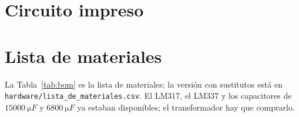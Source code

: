 \documentclass[conference]{IEEEtran}
\begin{document}
\section{Circuito impreso}


\section{Lista de materiales}
La Tabla~\ref{tab:bom} es la lista de materiales; la versión con sustitutos está en \texttt{hardware/lista\_de\_materiales.csv}. El LM317, el LM337 y los capacitores de $\SI{15000}{\micro F}$ y $\SI{6800}{\micro F}$ ya estaban disponibles; el transformador hay que comprarlo.
\end{document}
